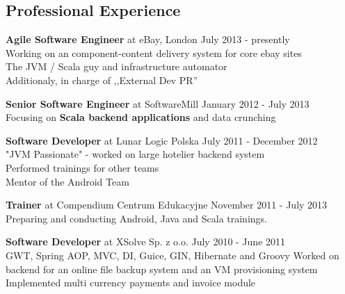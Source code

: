 \documentclass{res}
\begin{document}
 
 
 
\address{{\bf Konrad Malawski} \\
	Vienna -> Kraków -> London\\
	private mobile: +48 602 36 66 55 \\
	}
\address{
	email: konrad.malawski@project13.pl \\
  \textbf{linkedin: linkedin.com/in/konradmalawski} \\
	\textbf{github: github.com/ktoso} \\
	blog: \url{blog.project13.pl} \\
}


\begin{resume} 

\section{Professional Experience}
{\bf Agile Software Engineer} at eBay, London         \hfill July 2013 - presently \\
    Working on an component-content delivery system for core ebay sites \\
    The JVM / Scala guy and infrastructure automator \\
    Additionaly, in charge of ,,External Dev PR''

{\bf Senior Software Engineer} at SoftwareMill        \hfill January 2012 - July 2013 \\ 
    Focusing on \textbf{Scala backend applications} and data crunching

{\bf Software Developer} at Lunar Logic Polska        \hfill July 2011 - December 2012 \\ 
    "JVM Passionate" - worked on large hotelier backend system \\ 
    Performed trainings for other teams \\
    Mentor of the Android Team

{\bf Trainer} at Compendium Centrum Edukacyjne        \hfill November 2011 - July 2013 \\ 
	Preparing and conducting Android, Java and Scala trainings.
    
{\bf Software Developer} at XSolve Sp. z o.o.         \hfill July 2010 - June 2011\\
	GWT, Spring {AOP, MVC, DI}, Guice, GIN, Hibernate and Groovy
	Worked on backend for an online file backup system and an VM provisioning system
	Implemented multi currency payments and invoice module
    

\end{resume}
\end{document}
